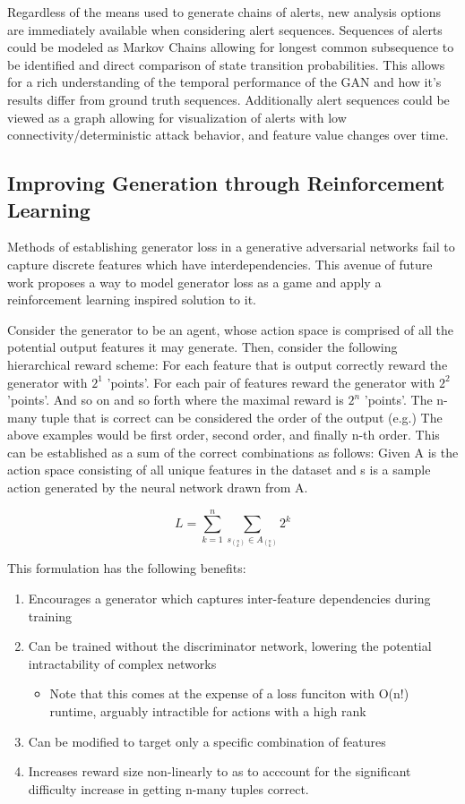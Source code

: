 Regardless of the means used to generate chains of alerts, new analysis options are immediately available when considering alert sequences. Sequences of alerts could be modeled as Markov Chains allowing for longest common subsequence to be identified and direct comparison of state transition probabilities. This allows for a rich understanding of the temporal performance of the GAN and how it's results differ from ground truth sequences. Additionally alert sequences could be viewed as a graph allowing for visualization of alerts with low connectivity/deterministic attack behavior, and feature value changes over time. 


\subsection{Improving Generation through Reinforcement Learning}

Methods of establishing generator loss in a generative adversarial networks fail to capture discrete features which have interdependencies. This avenue of future work proposes a way to model generator loss as a game and apply a reinforcement learning inspired solution to it. 

Consider the generator to be an agent, whose action space is comprised of all the potential output features it may generate. Then, consider the following  hierarchical reward scheme: For each feature that is output correctly reward the generator with $2^1$ 'points'. For each pair of features reward the generator with $2^2$ 'points'. And so on and so forth where the maximal reward is $2^n$ 'points'. The n-many tuple that is correct can be considered the order of the output (e.g.) The above examples would be first order, second order, and finally n-th order. This can be established as a sum of the correct combinations as follows: Given A is the action space consisting of all unique features in the dataset	and s is a sample action generated by the neural network drawn from A.

\begin{equation}
L = \sum_{k=1}^{n}\sum_{s_{{(^n_k)}} \in A_{(^n_k)}} 2^k
\end{equation}

This formulation has the following benefits:
\begin{enumerate}
	\item Encourages a generator which captures inter-feature dependencies during training
	\item Can be trained without the discriminator network, lowering the potential intractability of complex networks
	\begin{itemize}
		\item Note that this comes at the expense of a loss funciton with O(n!) runtime, arguably intractible for actions with a high rank
	\end{itemize}
	\item Can be modified to target only a specific combination of features
	\item Increases reward size non-linearly to as to acccount for the significant difficulty increase in getting n-many tuples correct.
\end{enumerate}

